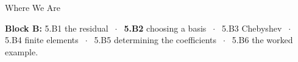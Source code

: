 

\graphicspath{{./figures/}}





\makedecktitle

\begin{frame}{Where We Are}
\vspace{-1mm}
\begin{center}
\small \textbf{Block B:} 5.B1 the residual $\;\cdot\;$ \textbf{5.B2} choosing a basis $\;\cdot\;$ 5.B3 Chebyshev $\;\cdot\;$ 5.B4 finite elements $\;\cdot\;$ 5.B5 determining the coefficients $\;\cdot\;$ 5.B6 the worked example.
\end{center}
\end{frame}

